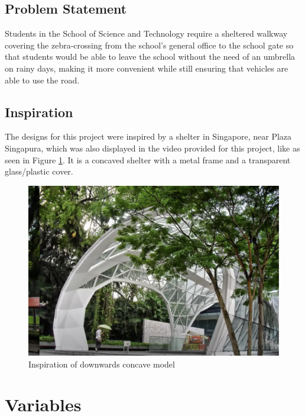 \documentclass[a4paper,titlepage]{article}
\begin{document}
\subsection{Problem Statement}\label{sec:Introduction:Problem Statement}

Students in the School of Science and Technology require a sheltered walkway covering the zebra-crossing from the school's general office to the school gate so that students would be able to leave the school without the need of an umbrella on rainy days, making it more convenient while still ensuring that vehicles are able to use the road.

\subsection{Inspiration}

The designs for this project were inspired by a shelter in Singapore, near Plaza Singapura, which was also displayed in the video provided for this project, like as seen in Figure \ref{fig:downwardsConcaveInspiration}. It is a concaved shelter with a metal frame and a transparent glass/plastic cover.

\begin{figure}[htbp]
    \centering
    \includegraphics[width=\textwidth]{downwardsConcaveInspiration.png}
    \caption{Inspiration of downwards concave model}
    \label{fig:downwardsConcaveInspiration}
\end{figure}

\pagebreak
\section{Variables}\label{sec:Variables}
\end{document}
